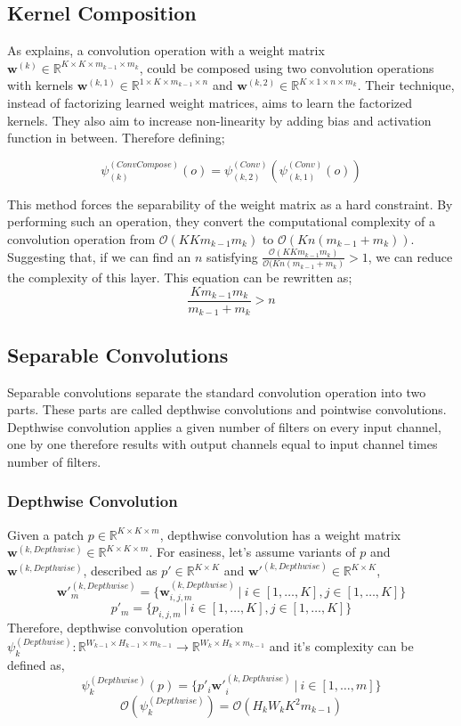 \subsection{Kernel Composition}
As  \cite{alvarez2016decomposeme} explains, a convolution operation with a weight matrix $\mathbf{w}^{(k)} \in \mathbb{R}^{K \times K \times m_{k-1} \times m_k}$, could be composed using two convolution operations with kernels $\mathbf{w}^{(k,1)} \in \mathbb{R}^{1 \times K \times m_{k-1} \times n}$ and $\mathbf{w}^{(k,2)} \in \mathbb{R}^{K \times 1 \times n \times m_k}$. Their technique, instead of factorizing learned weight matrices, aims to learn the factorized kernels. They also aim to increase non-linearity by adding bias and activation function in between. Therefore defining;

$$ \psi_{(k)}^{(ConvCompose)}(o) = \psi_{(k,2)}^{(Conv)}(\psi_{(k,1)}^{(Conv)}(o))$$

This method forces the separability of the weight matrix as a hard constraint. By performing such an operation, they convert the computational complexity of a convolution operation from $\mathcal{O}(KKm_{k-1}m_k)$ to $\mathcal{O}(Kn(m_{k-1} +m_{k}))$. Suggesting that, if we can find an $n$ satisfying $\frac{\mathcal{O}(KKm_{k-1}m_k)}{\mathcal{O}(Kn(m_{k-1} +m_{k})} > 1$, we can reduce the complexity of this layer. This equation can be rewritten as;
$$ \frac{Km_{k-1}m_k}{m_{k-1} + m_k} > n$$


\subsection{Separable Convolutions}
Separable convolutions separate the standard convolution operation into two parts. These parts are called depthwise convolutions and pointwise convolutions. Depthwise convolution applies a given number of filters on every input channel, one by one therefore results with output channels equal to input channel times number of filters. 
\subsubsection{Depthwise Convolution}
Given a patch $p \in \mathbb{R}^{K \times K \times m}$, depthwise convolution has a weight matrix $\mathbf{w}^{(k, Depthwise)} \in \mathbb{R}^{K \times K \times m}$. For easiness, let's assume variants of $p$ and $\mathbf{w}^{(k, Depthwise)}$, described as $p' \in \mathbb{R}^{K \times K}$ and $\mathbf{w}'^{(k, Depthwise)}  \in \mathbb{R}^{K \times K}$,
$$\mathbf{w}'^{(k, Depthwise)}_m = \{ \mathbf{w}^{(k, Depthwise)}_{i,j,m} \ | \ i \in [1, \ldots, K], j \in [1, \ldots, K] \}$$
$$p'_m = \{ p_{i,j,m} \ | \ i \in [1, \ldots, K], j \in [1, \ldots, K] \}$$
Therefore, depthwise convolution operation $\psi_k^{(Depthwise)} : \mathbb{R}^{W_{k-1} \times H_{k-1} \times m_{k-1}} \rightarrow \mathbb{R}^{W_{k} \times H_{k} \times m_{k-1}} $ and it's complexity can be defined as, 
$$\psi_k^{(Depthwise)}(p) = \{ p'_i\mathbf{w}'^{(k, Depthwise)}_i \ | \ i \in [1, \ldots, m] \} $$
$$ \mathcal{O} (\psi_k^{(Depthwise)}) = \mathcal{O} (H_kW_kK^2m_{k-1}) $$

